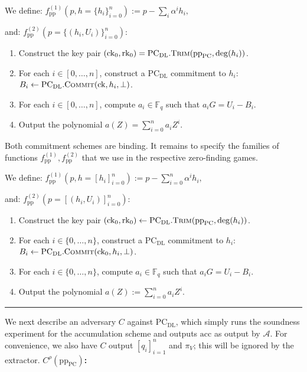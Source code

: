 \documentclass[
]{article}
\providecommand{\tightlist}{%
  \setlength{\itemsep}{0pt}\setlength{\parskip}{0pt}}
\newcommand*\Fb{\mathbb{F}}
\newcommand*{\pp}{\mathrm{pp}}
\newcommand*{\Trim}{\mathrm{\text{T{\scriptsize RIM}}}}
\newcommand*{\Commit}{\mathrm{\text{C{\scriptsize OMMIT}}}}
\newcommand*{\PC}{\text{PC}}
\newcommand*{\PCDL}{\text{PC}_{\text{DL}}}
\newcommand*{\PCDLTrim}{\PCDL.\Trim}
\newcommand*{\PCDLCommit}{\PCDL.\Commit}
\begin{document}
We define:
\(f^{(1)}_{\text{pp}}(p, h = \{h_i\}_{i=0}^n) := p - \sum_{i} \alpha^i h_i,\)

and: \(f^{(2)}_{\text{pp}}(p = \{(h_i, U_i)\}_{i=0}^n):\)

\begin{enumerate}
\def\labelenumi{\arabic{enumi}.}
\tightlist
\item
  Construct the key pair
  \((\text{ck}_0, \text{rk}_0) = \PCDLTrim(\pp_\PC, \deg(h_i))\).
\item
  For each \(i \in [0, \ldots, n]\), construct a \(\PCDL\) commitment to
  \(h_i\): \(B_i \leftarrow \PCDLCommit(\text{ck}, h_i, \bot)\).
\item
  For each \(i \in [0, \ldots, n]\), compute \(a_i \in \Fb_q\) such that
  \(a_i G = U_i - B_i\).
\item
  Output the polynomial \(a(Z) = \sum_{i=0}^n a_i Z^i\).
\end{enumerate}

Both commitment schemes are binding. It remains to specify the families
of functions \(f_{\text{pp}}^{(1)}, f_{\text{pp}}^{(2)}\) that we use in
the respective zero-finding games.

We define:
\(f_{\text{pp}}^{(1)}(p, h = [h_i]_{i=0}^n) := p - \sum_{i=0}^n \alpha^i h_i,\)

and: \(f_{\text{pp}}^{(2)}(p = [(h_i, U_i)]_{i=0}^n):\)

\begin{enumerate}
\def\labelenumi{\arabic{enumi}.}
\tightlist
\item
  Construct the key pair
  \((\text{ck}_0, \text{rk}_0) \leftarrow \PCDLTrim(\text{pp}_{\text{PC}}, \deg(h_i))\).
\item
  For each \(i \in \{0, \ldots, n\}\), construct a \(\PCDL\) commitment
  to \(h_i\): \(B_i \leftarrow \PCDLCommit(\text{ck}_0, h_i, \bot)\).
\item
  For each \(i \in \{0, \ldots, n\}\), compute \(a_i \in \mathbb{F}_q\)
  such that \(a_i G = U_i - B_i\).
\item
  Output the polynomial \(a(Z) := \sum_{i=0}^n a_i Z^i\).
\end{enumerate}

\begin{center}\rule{0.5\linewidth}{0.5pt}\end{center}

We next describe an adversary \(C\) against \(\PCDL\), which simply runs
the soundness experiment for the accumulation scheme and outputs
\(\text{acc}\) as output by \(\mathcal{A}\). For convenience, we also
have \(C\) output \([q_i]_{i=1}^n\) and \(\pi_V\); this will be ignored
by the extractor. \textbf{\(C^\rho(\text{pp}_{\text{PC}})\):}
\end{document}

